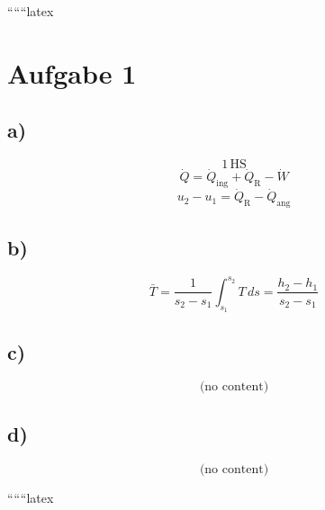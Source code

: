 
``````latex


\section*{Aufgabe 1}

\subsection*{a)}
\[
1 \, \text{HS}
\]
\[
\dot{Q} = \dot{Q}_{\text{ing}} + \dot{Q}_{\text{R}} - \dot{W}
\]
\[
u_2 - u_1 = \dot{Q}_{\text{R}} - \dot{Q}_{\text{ang}}
\]

\subsection*{b)}
\[
\bar{T} = \frac{1}{s_2 - s_1} \int_{s_1}^{s_2} T \, ds = \frac{h_2 - h_1}{s_2 - s_1}
\]

\subsection*{c)}
\[
\text{(no content)}
\]

\subsection*{d)}
\[
\text{(no content)}
\]

``````latex


